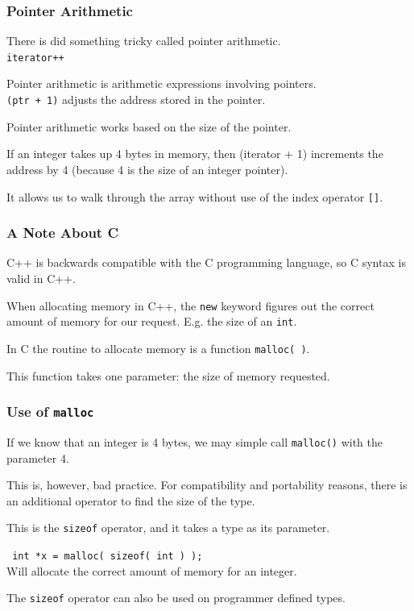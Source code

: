 \begin{frame}
\frametitle{Pointer Arithmetic}

There is did something tricky called \alert{pointer arithmetic}.\\
\quad \texttt{iterator++}

Pointer arithmetic is arithmetic expressions involving pointers.\\
\quad \texttt{(ptr + 1)} adjusts the address stored in the pointer.

Pointer arithmetic works based on the size of the pointer.

If an integer takes up 4 bytes in memory, then {(iterator + 1)} increments the address by 4 (because 4 is the size of an integer pointer).

It allows us to walk through the array without use of the index operator \texttt{[]}.

\end{frame}



\begin{frame}
\frametitle{A Note About C}

C++ is backwards compatible with the C programming language, so C syntax is valid in C++.

When allocating memory in C++, the \texttt{new} keyword figures out the correct amount of memory for our request. E.g. the size of an \texttt{int}.

In C the routine to allocate memory is a function \texttt{malloc( )}.

This function takes one parameter: the size of memory requested.

\end{frame}



\begin{frame}
\frametitle{Use of \texttt{malloc}}

If we know that an integer is 4 bytes, we may simple call \texttt{malloc()} with the parameter 4.

This is, however, bad practice. For compatibility and portability reasons, there is an additional operator to find the size of the type.

This is the \texttt{sizeof} operator, and it takes a type as its parameter.

\texttt{ int *x = malloc( sizeof( int ) );}\\
\quad Will allocate the correct amount of memory for an integer.

The \texttt{sizeof} operator can also be used on programmer defined types.

\end{frame}



